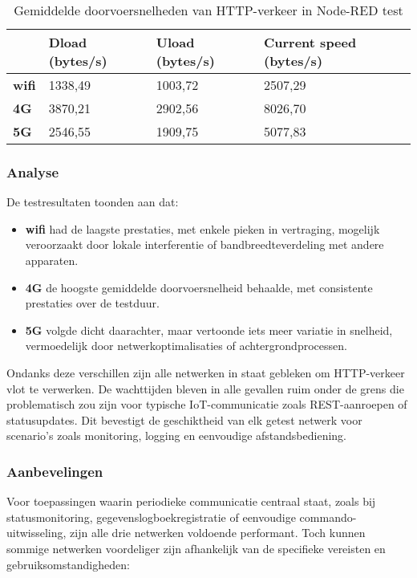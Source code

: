 \begin{table}[h]
    \caption{Gemiddelde doorvoersnelheden van HTTP-verkeer in Node-RED test}
    \begin{tabular}{l l l l}
        \cline{2-4}
        & \textbf{Dload (bytes/s)} & \textbf{Uload (bytes/s)} & \textbf{Current speed (bytes/s)} \\ \hline
        \multicolumn{1}{l}{\textbf{wifi}}       & 1338,49                     & 1003,72                    & 2507,29                             \\ \hline       
        \multicolumn{1}{l}{\textbf{4G}} & 3870,21                     & 2902,56                    & 8026,70                             \\ \hline
        \multicolumn{1}{l}{\textbf{5G}} & 2546,55                     & 1909,75                    & 5077,83                             \\ \hline
    \end{tabular}
    
\end{table}

\subsubsection{Analyse}

De testresultaten toonden aan dat:
\begin{itemize}
    \item \textbf{wifi} had de laagste prestaties, met enkele pieken in vertraging, mogelijk veroorzaakt door lokale interferentie of bandbreedteverdeling met andere apparaten.
    \item \textbf{4G} de hoogste gemiddelde doorvoersnelheid behaalde, met consistente prestaties over de testduur.
    \item \textbf{5G} volgde dicht daarachter, maar vertoonde iets meer variatie in snelheid, vermoedelijk door netwerkoptimalisaties of achtergrondprocessen.
    
\end{itemize}

Ondanks deze verschillen zijn alle netwerken in staat gebleken om HTTP-verkeer vlot te verwerken. De wachttijden bleven in alle gevallen ruim onder de grens die problematisch zou zijn voor typische IoT-communicatie zoals REST-aanroepen of statusupdates. Dit bevestigt de geschiktheid van elk getest netwerk voor scenario’s zoals monitoring, logging en eenvoudige afstandsbediening.

\subsubsection{Aanbevelingen}
Voor toepassingen waarin periodieke communicatie centraal staat, zoals bij statusmonitoring, gegevenslogboekregistratie of eenvoudige commando-uitwisseling, zijn alle drie netwerken voldoende performant. Toch kunnen sommige netwerken voordeliger zijn afhankelijk van de specifieke vereisten en gebruiksomstandigheden:

